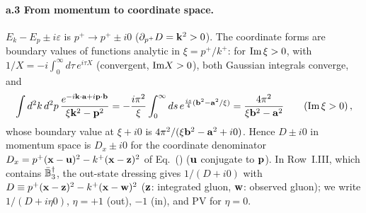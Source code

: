 \paragraph{a.3 From momentum to coordinate space.} $E_k-E_p\pm i\varepsilon$ is $p^+\to p^+\pm i0$ ($\partial_{p^+}D=\mathbf{k}^2>0$). The coordinate forms are boundary values of functions analytic in $\xi=p^+/k^+$: for ${\rm Im}\,\xi>0$, with $1/X=-i\int_0^\infty d\tau\,e^{i\tau X}$ (convergent, ${\rm Im}X>0$), both Gaussian integrals converge, and
\begin{align}
\int d^2k\,d^2p\,\frac{e^{-i\mathbf{k}\cdot\mathbf{a}+i\mathbf{p}\cdot\mathbf{b}}}{\xi\mathbf{k}^2-\mathbf{p}^2}=-\frac{i\pi^2}{\xi}\int_0^\infty ds\,e^{\frac{is}{4}(\mathbf{b}^2-\mathbf{a}^2/\xi)}=\frac{4\pi^2}{\xi\mathbf{b}^2-\mathbf{a}^2}\qquad({\rm Im}\,\xi>0)\,,
\end{align}
whose boundary value at $\xi+i0$ is $4\pi^2/(\xi\mathbf{b}^2-\mathbf{a}^2+i0)$. Hence $D\pm i0$ in momentum space is $D_x\pm i0$ for the coordinate denominator $D_x=p^+(\mathbf{x}-\mathbf{u})^2-k^+(\mathbf{x}-\mathbf{z})^2$ of Eq.~() ($\mathbf{u}$ conjugate to $\mathbf{p}$). In Row~I.III, which contains $\bar{\mathbb{B}}_3^\dagger$, the out-state dressing gives $1/(D+i0)$ with $D\equiv p^+(\mathbf{x}-\mathbf{z})^2-k^+(\mathbf{x}-\mathbf{w})^2$ ($\mathbf{z}$: integrated gluon, $\mathbf{w}$: observed gluon); we write $1/(D+i\eta0)$, $\eta=+1$ (out), $-1$ (in), and PV for $\eta=0$.

